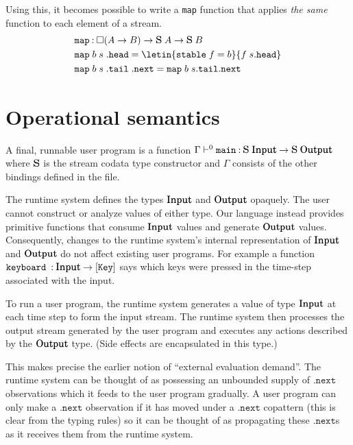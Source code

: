 \documentclass[acmsmall, natbib=false]{acmart}
\newcommand{\always}{\square}
\renewcommand{\next}{\mathtt{.next}}
\begin{document}
Using this, it becomes possible to write a \texttt{map} function that applies
\emph{the same} function to each element of a stream.
%
\begin{align*}
  &\mathtt{map} \hastype \always (A \to B) \to \mathqd{S}\; A \to \mathqd{S}\; B \\
  &\mathtt{map}\; b\; s\; \mathtt{.head} =
    \letin{\mathtt{stable}\; f = b}{f\; s\mathtt{.head}} \\
  &\mathtt{map}\; b\; s\; \mathtt{.tail}\; \next =
    \mathtt{map}\; b\; s\mathtt{.tail}\next
\end{align*}

\section{Operational semantics}
\label{sec:operational}

A final, runnable user program is a function
$\Gamma \proves^0
\mathtt{main} \hastype
\mathqd{S}\; \mathqd{Input} \to \mathqd{S}\; \mathqd{Output}$
where $\mathqd{S}$ is the stream codata type constructor and $\Gamma$ consists
of the other bindings defined in the file.

The runtime system defines the types $\mathqd{Input}$ and $\mathqd{Output}$
opaquely. The user cannot construct or analyze values of either type.
Our language instead provides primitive functions that consume $\mathqd{Input}$
values and generate $\mathqd{Output}$ values.
Consequently, changes to the runtime system's internal representation of
$\mathqd{Input}$ and $\mathqd{Output}$ do not affect existing user programs.
%
For example a function
$\mathtt{keyboard}\;\hastype\mathqd{Input}\to\mathtt{[Key]}$ says which keys
were pressed in the time-step associated with the input.

To run a user program, the runtime system generates a value of type
$\mathqd{Input}$ at each time step to form the input stream. The runtime system
then processes the output stream generated by the user program and executes any
actions described by the $\mathqd{Output}$ type. (Side effects are encapsulated
in this type.)

This makes precise the earlier notion of ``external evaluation demand''. The
runtime system can be thought of as possessing an unbounded supply of $\next$
observations which it feeds to the user program gradually.
A user program can only make a $\next$ observation if it has moved under a
$\next$ copattern (this is clear from the typing rules) so it can be thought of
as propagating these $\next$s as it receives them from the runtime system.
\end{document}
